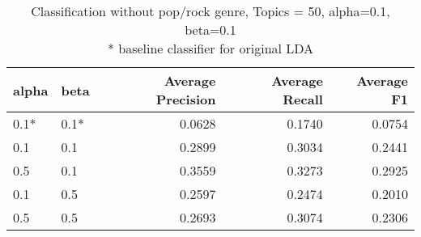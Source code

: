 \begin{table}[h]
\begin{tabular}{|l|l|r|r|r|}

\hline
\textbf{alpha} & \textbf{beta} &  \textbf{Average Precision} & \textbf{Average Recall} & \textbf{Average F1} \\
\hline
0.1* & 0.1* & 0.0628&  0.1740 &	0.0754\\
0.1 & 0.1 & 0.2899 	&0.3034 &	0.2441\\
0.5 & 0.1 & 0.3559	& 0.3273	& 0.2925\\
0.1 & 0.5 & 0.2597 & 	0.2474 & 	0.2010\\
0.5 & 0.5	&	0.2693 &	0.3074 &	0.2306\\
\hline
\end{tabular}
\caption{Classification without pop/rock genre, Topics = 50, alpha=0.1, beta=0.1\\ * baseline classifier for original LDA}
\end{table}